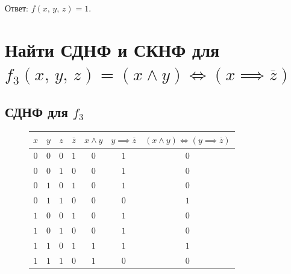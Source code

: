 \documentclass[12pt,a4paper]{article}
\theoremstyle{plain}
\theoremstyle{definition}
\theoremstyle{remark}
\numberwithin{equation}{section}
\begin{document}
\noindent Ответ: $f(x,\,y,\,z) = 1$.

\section{Найти СДНФ и СКНФ для $f_3(x,\,y,\,z) = (x \land y) \iff (x \implies \overline{z})$}

\subsection{СДНФ для $f_3$}

\begin{figure}[H]
  \begin{minipage}[t]{0.55\linewidth}
    \vspace{0em}
    \begin{tabularx}{\textwidth}{|c|c|c|c|c|c|C|}
      \hline
      $x$ & $y$ & $z$ & $\overline{z}$ & $x \land y$ & $y \implies \overline{z}$ & $(x \land y) \iff (y \implies \overline{z})$ \\
      \hline
      $0$ & $0$ & $0$ & $1$ & $0$ & $1$ & $0$ \\
      $0$ & $0$ & $1$ & $0$ & $0$ & $1$ & $0$ \\  
      $0$ & $1$ & $0$ & $1$ & $0$ & $1$ & $0$ \\
      $0$ & $1$ & $1$ & $0$ & $0$ & $0$ & $1$ \\
      $1$ & $0$ & $0$ & $1$ & $0$ & $1$ & $0$ \\
      $1$ & $0$ & $1$ & $0$ & $0$ & $1$ & $0$ \\
      $1$ & $1$ & $0$ & $1$ & $1$ & $1$ & $1$ \\
      $1$ & $1$ & $1$ & $0$ & $1$ & $0$ & $0$ \\
      \hline  
    \end{tabularx}


\end{minipage}
\end{figure}
\end{document}
